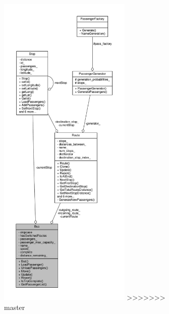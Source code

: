\begin{figure}[H]
\begin{center}
\begin{figure}[H]
\begin{center}
\leavevmode
\includegraphics[width=179pt]{classBus__coll__graph}
>>>>>>> master
\end{center}
\end{figure}

\end{center}
\end{figure}
